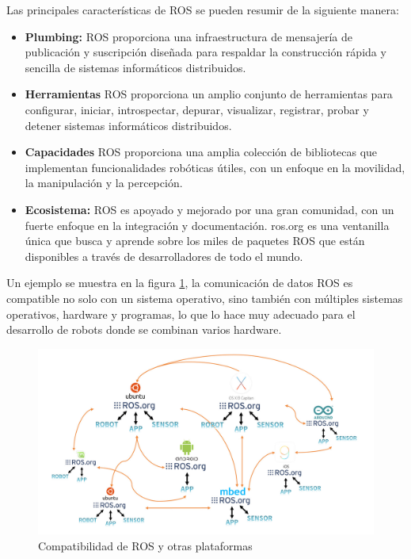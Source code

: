         Las principales características de ROS se pueden resumir de la siguiente manera:
        
        \begin{itemize}
            \item \textbf{Plumbing:} ROS proporciona una infraestructura de mensajería de publicación y suscripción diseñada para respaldar la construcción rápida y sencilla de sistemas informáticos distribuidos.
            \item \textbf{Herramientas} ROS proporciona un amplio conjunto de herramientas para configurar, iniciar, introspectar, depurar, visualizar, registrar, probar y detener sistemas informáticos distribuidos.
            \item \textbf{Capacidades} ROS proporciona una amplia colección de bibliotecas que implementan funcionalidades robóticas útiles, con un enfoque en la movilidad, la manipulación y la percepción.
            \item \textbf{Ecosistema:} ROS es apoyado y mejorado por una gran comunidad, con un fuerte enfoque en la integración y documentación. ros.org es una ventanilla única que busca y aprende sobre los miles de paquetes ROS que están disponibles a través de desarrolladores de todo el mundo.
        \end{itemize}

        Un ejemplo se muestra en la figura \ref{f:Cap3-4_compatibilidad_ros}, la comunicación de datos ROS es compatible no solo con un sistema operativo, sino también con múltiples sistemas operativos, hardware y programas, lo que lo hace muy adecuado para el desarrollo de robots donde se combinan varios hardware. 
        
        \begin{figure}[htb]
            \centering
            \includegraphics[width=1.0\linewidth]{Main/Chapter3/Images3/3-4/compatibilidad-ros.png}
            \caption{Compatibilidad de ROS y otras plataformas \cite{ROS_BOOK_1}}
            \label{f:Cap3-4_compatibilidad_ros}
        \end{figure}
        
